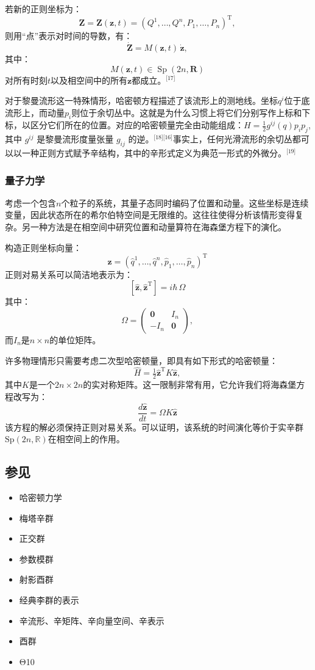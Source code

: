 若新的正则坐标为：
$$
\mathbf{Z} = \mathbf{Z}(\mathbf{z}, t) = (Q^{1}, \ldots, Q^{n}, P_{1}, \ldots, P_{n})^{\mathrm{T}},~
$$
则用“点”表示对时间的导数，有：
$$
\dot{\mathbf{Z}} = M(\mathbf{z}, t) \, \dot{\mathbf{z}},~
$$
其中：
$$
M(\mathbf{z}, t) \in \operatorname{Sp}(2n, \mathbf{R})~
$$
对所有时刻$t$以及相空间中的所有$\mathbf{z}$都成立。\(^\text{[17]}\)

对于黎曼流形这一特殊情形，哈密顿方程描述了该流形上的测地线。坐标$q^{i}$位于底流形上，而动量$p_{i}$则位于余切丛中。这就是为什么习惯上将它们分别写作上标和下标，以区分它们所在的位置。对应的哈密顿量完全由动能组成：$H = \tfrac{1}{2} g^{ij}(q) p_{i} p_{j}$,其中 $g^{ij}$ 是黎曼流形度量张量 $g_{ij}$ 的逆。\(^\text{[18][16]}\)事实上，任何光滑流形的余切丛都可以以一种正则方式赋予辛结构，其中的辛形式定义为典范一形式的外微分。\(^\text{[19]}\)
\subsubsection{量子力学}
考虑一个包含$n$个粒子的系统，其量子态同时编码了位置和动量。这些坐标是连续变量，因此状态所在的希尔伯特空间是无限维的。这往往使得分析该情形变得复杂。另一种方法是在相空间中研究位置和动量算符在海森堡方程下的演化。

构造正则坐标向量：
$$
\mathbf{\hat{z}} = (\hat{q}^{1}, \ldots, \hat{q}^{n}, \hat{p}_{1}, \ldots, \hat{p}_{n})^{\mathrm{T}}~
$$
正则对易关系可以简洁地表示为：
$$
[\mathbf{\hat{z}}, \mathbf{\hat{z}}^{\mathrm{T}}] = i \hbar \, \Omega~
$$
其中：
$$
\Omega = 
\begin{pmatrix}
\mathbf{0} & I_{n} \\
- I_{n} & \mathbf{0}
\end{pmatrix},~
$$
而$I_n$是$n \times n$的单位矩阵。

许多物理情形只需要考虑二次型哈密顿量，即具有如下形式的哈密顿量：
$$
\hat{H} = \tfrac{1}{2} \mathbf{\hat{z}}^{\mathrm{T}} K \mathbf{\hat{z}},~
$$
其中$K$是一个$2n \times 2n$的实对称矩阵。这一限制非常有用，它允许我们将海森堡方程改写为：
$$
\frac{d \mathbf{\hat{z}}}{dt} = \Omega K \mathbf{\hat{z}}~
$$
该方程的解必须保持正则对易关系。可以证明，该系统的时间演化等价于实辛群 $\mathrm{Sp}(2n, \mathbb{R})$在相空间上的作用。
\subsection{参见}
\begin{itemize}
\item 哈密顿力学 
\item 梅塔辛群 
\item 正交群
\item 参数模群
\item 射影酉群 
\item 经典李群的表示 
\item 辛流形、辛矩阵、辛向量空间、辛表示
\item 酉群 
\item Θ10
\end{itemize}
